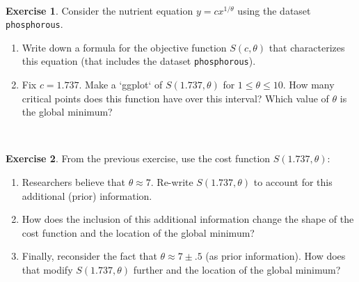 \documentclass[
]{book}
\theoremstyle{definition}
\theoremstyle{definition}
\theoremstyle{definition}
\newtheorem{exercise}{Exercise}[chapter]
\theoremstyle{remark}
\begin{document}
~

\begin{exercise}
\protect\hypertarget{exr:unnamed-chunk-178}{}{\label{exr:unnamed-chunk-178} }Consider the nutrient equation \(\displaystyle y = c x^{1/\theta}\) using the dataset \texttt{phosphorous}.

\begin{enumerate}[label=\alph*.]
\item Write down a formula for the objective function $S(c,\theta)$ that characterizes this equation (that includes the dataset \texttt{phosphorous}).
\item Fix $c=1.737$.  Make a `ggplot` of $S(1.737,\theta)$ for $1 \leq \theta \leq 10$.  How many critical points does this function have over this interval?  Which value of $\theta$ is the global minimum?
\end{enumerate}
\end{exercise}

~

\begin{exercise}
\protect\hypertarget{exr:unnamed-chunk-179}{}{\label{exr:unnamed-chunk-179} }From the previous exercise, use the cost function \(S(1.737,\theta)\):

\begin{enumerate}[label=\alph*.]
\item Researchers believe that $\theta \approx 7$.  Re-write $S(1.737,\theta)$ to account for this additional (prior) information.
\item How does the inclusion of this additional information change the shape of the cost function and the location of the global minimum?
\item Finally, reconsider the fact that $\theta \approx 7 \pm .5$ (as prior information).  How does that modify $S(1.737,\theta)$ further and the location of the global minimum?
\end{enumerate}
\end{exercise}

~
\end{document}
